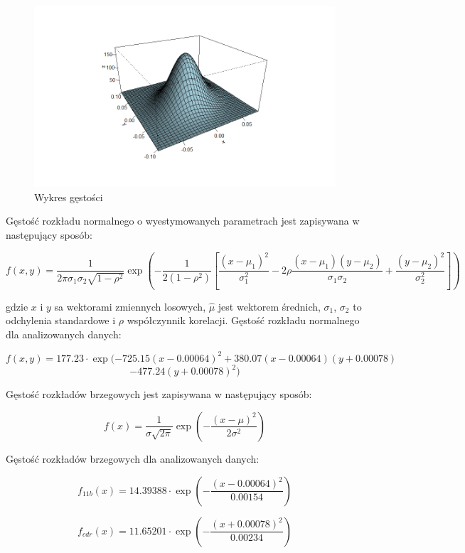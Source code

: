 \documentclass[a4paper,11pt]{article}
\def\\{\hfill\break}
\begin{document}
\begin{figure}[H]
    \includegraphics[width=13cm]{Wykresy/Wykres_gestosci.png}
    \caption{Wykres gęstości}
    \label{fig:mlp}
\end{figure}

\newpage

Gęstość rozkładu normalnego o wyestymowanych parametrach  jest zapisywana w następujący sposób:


$$f(x, y) = \frac{1}{2\pi\sigma_1\sigma_2\sqrt{1 - \rho^2}} \exp\left(-\frac{1}{2(1 - \rho^2)}\left[\frac{(x - \mu_1)^2}{\sigma_1^2} - 2\rho\frac{(x - \mu_1)(y - \mu_2)}{\sigma_1\sigma_2} + \frac{(y - \mu_2)^2}{\sigma_2^2}\right]\right)$$

gdzie $x$ i $y$ sa wektorami zmiennych losowych, $\hat{\mu}$ jest wektorem średnich, $\sigma_1$, $\sigma_2$ to odchylenia standardowe i $\rho$ współczynnik korelacji.\\
\\
Gęstość rozkładu normalnego dla analizowanych danych:

$$f(x, y) = 177.23\cdot\exp(-725.15(x-0.00064)^2 + 380.07(x-0.00064)(y+0.00078)$$
$$-477.24(y + 0.00078)^2)$$


\\
Gęstość rozkładów brzegowych jest zapisywana w następujący sposób:


$$f(x) = \frac{1}{\sigma\sqrt{2\pi}}\exp\left(-\frac{(x-\mu)^2}{2\sigma^2}\right)$$

\\

Gęstość rozkładów brzegowych dla analizowanych danych:


$$f_{11b}(x) = 14.39388\cdot\exp\left(-\frac{(x-0.00064)^2}{0.00154}\right)$$


$$f_{cdr}(x) = 11.65201\cdot\exp\left(-\frac{(x+0.00078)^2}{0.00234}\right)$$
\end{document}
